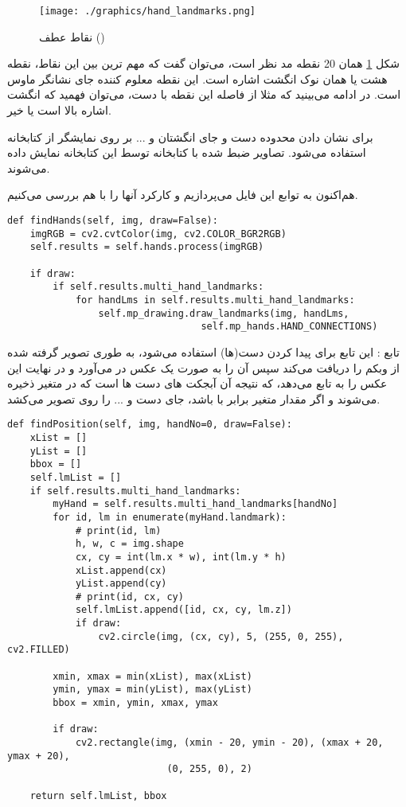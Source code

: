 \documentclass{article}
\begin{document}
\begin{figure}
	\centering
	\texttt{[image: ./graphics/hand\_landmarks.png]}
	\caption{نقاط عطف ()}
	\label{landmark}
\end{figure}

شکل \ref{landmark} همان 20 نقطه مد نظر است، می‌توان گفت که مهم ترین بین این نقاط، نقطه هشت یا همان نوک انگشت اشاره است. این نقطه معلوم کننده جای نشانگر ماوس است. در ادامه می‌بینید که مثلا از فاصله این نقطه با دست، می‌توان فهمید که انگشت اشاره بالا است یا خیر.
\cite{medipipe}

برای نشان دادن محدوده دست و جای انگشتان و ... بر روی نمایشگر از کتابخانه  استفاده می‌شود. تصاویر ضبط شده با کتابخانه  توسط این کتابخانه نمایش داده می‌شوند. 
\cite{cv2}

هم‌اکنون به توابع این فایل می‌پردازیم و کارکرد آنها را با هم بررسی می‌کنیم.

\begin{latin}
\begin{lstlisting}
def findHands(self, img, draw=False):
    imgRGB = cv2.cvtColor(img, cv2.COLOR_BGR2RGB)
    self.results = self.hands.process(imgRGB)

    if draw:
        if self.results.multi_hand_landmarks:
            for handLms in self.results.multi_hand_landmarks:
                self.mp_drawing.draw_landmarks(img, handLms,
                                  self.mp_hands.HAND_CONNECTIONS)
\end{lstlisting}
\end{latin}

تابع :
این تابع برای پیدا کردن دست(ها) استفاده می‌شود، به طوری تصویر گرفته شده از وبکم را دریافت می‌کند سپس آن را به صورت یک عکس  در می‌آورد و در نهایت این عکس را به تابع  می‌دهد، که نتیجه آن آبجکت های دست ها است که در متغیر  ذخیره می‌شوند و اگر مقدار متغیر  برابر با  باشد، جای دست و ... را روی تصویر می‌کشد.

\begin{latin}
\begin{lstlisting}
def findPosition(self, img, handNo=0, draw=False):
    xList = []
    yList = []
    bbox = []
    self.lmList = []
    if self.results.multi_hand_landmarks:
        myHand = self.results.multi_hand_landmarks[handNo]
        for id, lm in enumerate(myHand.landmark):
            # print(id, lm)
            h, w, c = img.shape
            cx, cy = int(lm.x * w), int(lm.y * h)
            xList.append(cx)
            yList.append(cy)
            # print(id, cx, cy)
            self.lmList.append([id, cx, cy, lm.z])
            if draw:
                cv2.circle(img, (cx, cy), 5, (255, 0, 255), cv2.FILLED)

        xmin, xmax = min(xList), max(xList)
        ymin, ymax = min(yList), max(yList)
        bbox = xmin, ymin, xmax, ymax

        if draw:
            cv2.rectangle(img, (xmin - 20, ymin - 20), (xmax + 20, ymax + 20),
                            (0, 255, 0), 2)

    return self.lmList, bbox
\end{lstlisting}
\end{latin}
\end{document}
